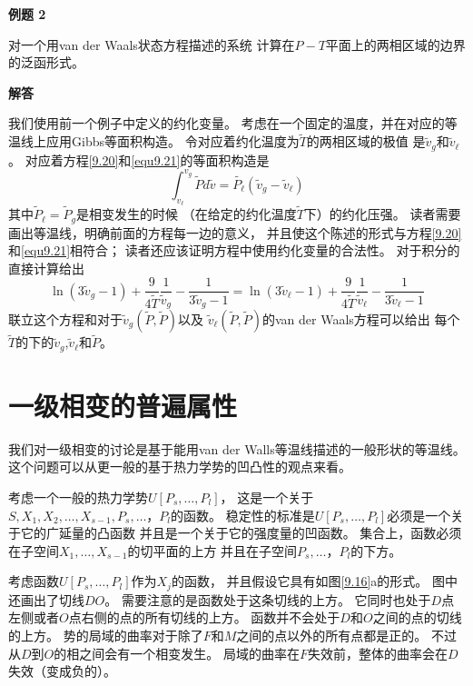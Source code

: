 {\bf 例题 2}

对一个用van der Waals状态方程描述的系统
计算在$P-T$平面上的两相区域的边界的泛函形式。

{\bf 解答}

我们使用前一个例子中定义的约化变量。
考虑在一个固定的温度，并在对应的等温线上应用Gibbs等面积构造。
令对应着约化温度为$\tilde{T}$的两相区域的极值
是$\tilde{v}_g$和$\tilde{v}_\ell$。
对应着方程\eqref{9.20}和\eqref{equ9.21}的等面积构造是
\begin{equation*}
\int_{v_\ell}^{v_g}\tilde{P}d\tilde{v}=\tilde{P_\ell}
(\tilde{v}_g-\tilde{v}_\ell)
\end{equation*}
其中$\tilde{P}_\ell=\tilde{P}_g$是相变发生的时候
（在给定的约化温度$\tilde{T}$下）的约化压强。
读者需要画出等温线，明确前面的方程每一边的意义，
并且使这个陈述的形式与方程\eqref{9.20}和\eqref{equ9.21}相符合；
读者还应该证明方程中使用约化变量的合法性。
对于积分的直接计算给出
\begin{equation*}
\ln(3\tilde{v}_g-1)+\frac{9}{4\tilde{T}}\frac{1}{\tilde{v}_g}
-\frac{1}{3\tilde{v}_g-1}=\ln(3\tilde{v}_\ell-1)
+\frac{9}{4\tilde{T}}\frac{1}{\tilde{v}_\ell}-\frac{1}{3\tilde{v}_\ell-1}
\end{equation*}
联立这个方程和对于$\tilde v_g(\tilde{P},\tilde{P})$以及
$\tilde v_\ell(\tilde{P},\tilde{P})$的van der Waals方程可以给出
每个$\tilde{T}$的下的$\tilde{v}_g$,$\tilde{v}_\ell$和$\tilde{P}$。

\section{一级相变的普遍属性}
\label{sec9.5}

我们对一级相变的讨论是基于能用van der Walls等温线描述的一般形状的等温线。
这个问题可以从更一般的基于热力学势的凹凸性的观点来看。

考虑一个一般的热力学势$U[P_s,\ldots,P_l]$，
这是一个关于$S,X_1,X_2,\ldots,X_{s-1},P_s,\ldots，P_l$的函数。
稳定性的标准是$U[P_s,\ldots,P_l]$必须是一个关于它的广延量的凸函数
并且是一个关于它的强度量的凹函数。
集合上，函数必须在子空间$X_1,\ldots,X_{s-1}$的切平面的上方
并且在子空间$P_s,\ldots，P_l$的下方。

考虑函数$U[P_s,\ldots,P_l]$作为$X_j$的函数，
并且假设它具有如图\ref{9.16}a的形式。
图中还画出了切线$DO$。
需要注意的是函数处于这条切线的上方。
它同时也处于$D$点左侧或者$O$点右侧的点的所有切线的上方。
函数并不会处于$D$和$O$之间的点的切线的上方。
势的局域的曲率对于除了$F$和$M$之间的点以外的所有点都是正的。
不过从$D$到$O$的相之间会有一个相变发生。
局域的曲率在$F$失效前，整体的曲率会在$D$失效（变成负的）。

